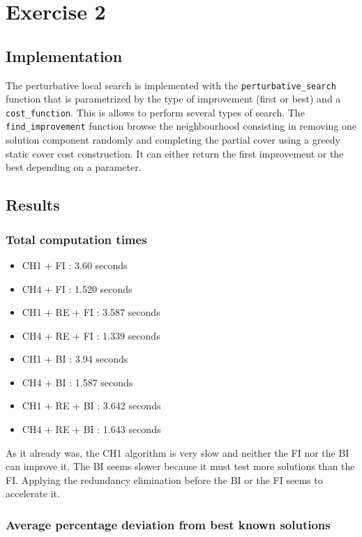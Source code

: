 \documentclass[a4paper,12pt]{article}
\begin{document}
\section{Exercise 2}

\subsection{Implementation}

The perturbative local search is implemented with the \texttt{perturbative\_search} function that is parametrized by the type of improvement (first or best) and a \texttt{cost\_function}. This is allows to perform several types of search. 
The \texttt{find\_improvement} function browse the neighbourhood consisting in removing one solution component randomly and completing the partial cover using a greedy static cover cost construction. It can either return the first improvement or the best depending on a parameter.

\subsection{Results}

\subsubsection{Total computation times}

\begin{itemize}
    \item CH1 + FI : 3.60 seconds
    \item CH4 + FI : 1.520 seconds
    \item CH1 + RE + FI : 3.587 seconds
    \item CH4 + RE + FI : 1.339 seconds
    \item CH1 + BI : 3.94 seconds
    \item CH4 + BI : 1.587 seconds
    \item CH1 + RE + BI : 3.642 seconds
    \item CH4 + RE + BI : 1.643 seconds
\end{itemize}

As it already was, the CH1 algorithm is very slow and neither the FI nor the BI can improve it. The BI seems slower because it must test more solutions than the FI. Applying the redundancy elimination before the BI or the FI seems to accelerate it.

\subsubsection{Average percentage deviation from best known solutions}
\end{document}
